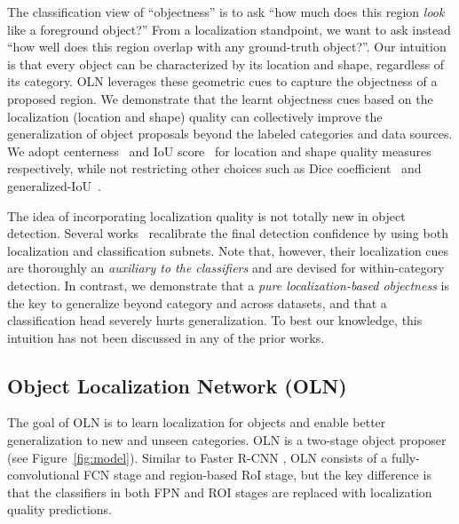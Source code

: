 \documentclass[10pt,twocolumn,letterpaper]{article}
\newcommand{\OURS}{OLN}
\newcommand{\figureref}[1]{Figure~\ref{#1}}
\begin{document}
The classification view of ``objectness'' is to ask ``how much does this region \textit{look} like a foreground object?'' From a localization standpoint, we want to ask instead ``how well does this region overlap with any ground-truth object?''. Our intuition is that every object can be characterized by its location and shape, regardless of its category. OLN leverages these geometric cues to capture the objectness of a proposed region. We demonstrate that the learnt objectness cues based on the localization (location and shape) quality can collectively improve the generalization of object proposals beyond the labeled categories and data sources. We adopt centerness~\cite{tian2019fcos} and IoU score~\cite{jiang2018acquisition} for location and shape quality measures respectively, while not restricting other choices such as Dice coefficient~\cite{milletari2016v} and generalized-IoU~\cite{rezatofighi2019generalized}.

The idea of incorporating localization quality is not totally new in object detection. Several works~\cite{huang2019mask,jiang2018acquisition,tian2019fcos,tychsen2018improving} recalibrate the final detection confidence by using both localization and classification subnets. Note that, however, their localization cues are thoroughly an \textit{auxiliary to the classifiers} and are devised for within-category detection. In contrast, we demonstrate that a \textit{pure localization-based objectness} is the key to generalize beyond category and across datasets, and that a classification head severely hurts generalization. To best our knowledge, this intuition has not been discussed in any of the prior works. 



\subsection{Object Localization Network (OLN)}
\label{sec:oln_method}
The goal of OLN is to learn localization for objects and enable better generalization to new and unseen categories.
\OURS{} is a two-stage object proposer (see \figureref{fig:model}). Similar to Faster R-CNN \cite{fasterNIPS2015}, \OURS{} consists of a fully-convolutional FCN stage and region-based RoI stage, but the key difference is that the classifiers in both FPN and ROI stages are replaced with localization quality predictions. 
\end{document}
